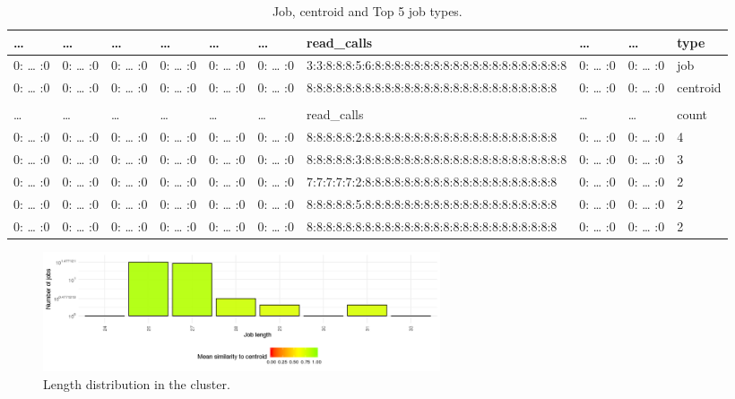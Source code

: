 \documentclass[]{llncs}
\begin{document}
\begin{table}
  \centering
  \begin{tabular}{@{ }l@{ }@{ }l@{ }@{ }l@{ }@{ }l@{ }@{ }l@{ }@{ }l@{ }@{ }l@{ }@{ }l@{ }@{ }l@{ }@{ }l@{ }}
    \dots & \dots & \dots & \dots & \dots & \dots & read\_calls & \dots & \dots & type \\
    \hline
    0: … :0 & 0: … :0 & 0: … :0 & 0: … :0 & 0: … :0 & 0: … :0 & 3:3:8:8:8:5:6:8:8:8:8:8:8:8:8:8:8:8:8:8:8:8:8:8:8:8:8 & 0: … :0 & 0: … :0 & job \\
    0: … :0 & 0: … :0 & 0: … :0 & 0: … :0 & 0: … :0 & 0: … :0 & 8:8:8:8:8:8:8:8:8:8:8:8:8:8:8:8:8:8:8:8:8:8:8:8:8:8 & 0: … :0 & 0: … :0 & centroid\\
    &&&&&&&&& \\
    \dots & \dots & \dots & \dots & \dots & \dots & read\_calls & \dots & \dots & count\\
    \hline
    0: … :0 & 0: … :0 & 0: … :0 & 0: … :0 & 0: … :0 & 0: … :0 & 8:8:8:8:8:2:8:8:8:8:8:8:8:8:8:8:8:8:8:8:8:8:8:8:8:8 & 0: … :0 & 0: … :0 & 4 \\
    0: … :0 & 0: … :0 & 0: … :0 & 0: … :0 & 0: … :0 & 0: … :0 & 8:8:8:8:8:3:8:8:8:8:8:8:8:8:8:8:8:8:8:8:8:8:8:8:8:8:8 & 0: … :0 & 0: … :0 & 3 \\
    0: … :0 & 0: … :0 & 0: … :0 & 0: … :0 & 0: … :0 & 0: … :0 & 7:7:7:7:7:2:8:8:8:8:8:8:8:8:8:8:8:8:8:8:8:8:8:8:8:8 & 0: … :0 & 0: … :0 & 2 \\
    0: … :0 & 0: … :0 & 0: … :0 & 0: … :0 & 0: … :0 & 0: … :0 & 8:8:8:8:8:5:8:8:8:8:8:8:8:8:8:8:8:8:8:8:8:8:8:8:8:8 & 0: … :0 & 0: … :0 & 2 \\
    0: … :0 & 0: … :0 & 0: … :0 & 0: … :0 & 0: … :0 & 0: … :0 & 8:8:8:8:8:8:8:8:8:8:8:8:8:8:8:8:8:8:8:8:8:8:8:8:8:8 & 0: … :0 & 0: … :0 & 2\\
  \end{tabular}
  \caption{Job, centroid and Top 5 job types.}
  \label{tab:use_case:pm_quant:top_jobs}
\end{table}

\begin{figure}
  \centering
  \includegraphics[width=4.61in,height=1.39in]{./media/image7.png}
  \caption{Length distribution in the cluster.}
  \label{fig:use_case:pm_quant:length}
\end{figure}
\end{document}
